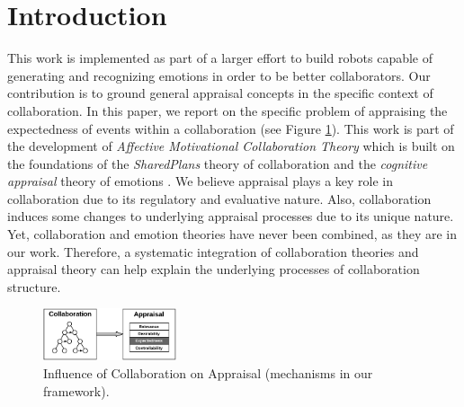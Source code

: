 \documentclass{aamas2016_extendedabstract}
\begin{document}
\vspace*{-2mm}

\vspace*{-2mm}
\section{Introduction}

This work is implemented as part of a larger effort to build robots capable of
generating and recognizing emotions in order to be better collaborators. Our
contribution is to ground general appraisal concepts in the specific context of
collaboration. In this paper, we report on the specific problem of appraising
the expectedness of events within a collaboration (see Figure \ref{fig:cpm}).
This work is part of the development of \textit{Affective Motivational
Collaboration Theory} \cite{shayganfar:theory-overview} which is built on the
foundations of the \textit{SharedPlans} theory of collaboration
\cite{grosz:plans-discourse} and the \textit{cognitive appraisal} theory of
emotions \cite{gratch:domain-independent}. We believe appraisal plays a key role
in collaboration due to its regulatory and evaluative nature. Also,
collaboration induces some changes to underlying appraisal processes due to its
unique nature. Yet, collaboration and emotion theories have never been combined,
as they are in our work. Therefore, a systematic integration of collaboration
theories and appraisal theory can help explain the underlying processes of
collaboration structure.

\begin{figure}[t]
  \centering
  \includegraphics[width=0.35\textwidth]{figure/actionselection-croped.pdf}
  \vspace*{-3mm}
  \caption{{\fontsize{8}{9}\selectfont Influence of Collaboration on Appraisal
  (mechanisms in our framework).}}
  \label{fig:cpm}
  \vspace*{-5mm}
\end{figure}
\end{document}
